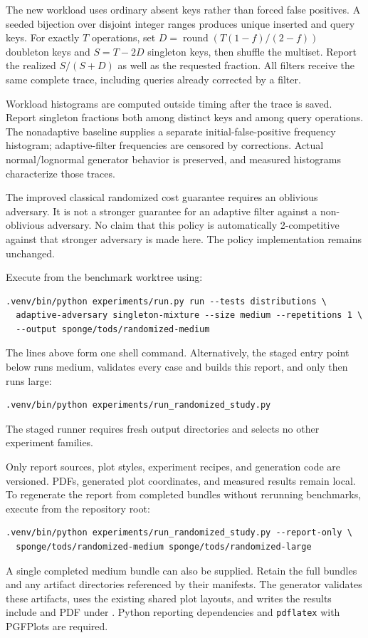 \documentclass[11pt]{article}
\begin{document}
The new workload uses ordinary absent keys rather than forced false positives. A seeded bijection over disjoint integer ranges produces unique inserted and query keys. For exactly $T$ operations, set $D=\operatorname{round}(T(1-f)/(2-f))$ doubleton keys and $S=T-2D$ singleton keys, then shuffle the multiset. Report the realized $S/(S+D)$ as well as the requested fraction. All filters receive the same complete trace, including queries already corrected by a filter.

Workload histograms are computed outside timing after the trace is saved. Report singleton fractions both among distinct keys and among query operations. The nonadaptive baseline supplies a separate initial-false-positive frequency histogram; adaptive-filter frequencies are censored by corrections. Actual normal/lognormal generator behavior is preserved, and measured histograms characterize those traces.

The improved classical randomized cost guarantee requires an oblivious adversary. It is not a stronger guarantee for an adaptive filter against a non-oblivious adversary. No claim that this policy is automatically 2-competitive against that stronger adversary is made here. The policy implementation remains unchanged.

Execute from the benchmark worktree using:
\begin{verbatim}
.venv/bin/python experiments/run.py run --tests distributions \
  adaptive-adversary singleton-mixture --size medium --repetitions 1 \
  --output sponge/tods/randomized-medium
\end{verbatim}
The lines above form one shell command. Alternatively, the staged entry point below runs medium, validates every case and builds this report, and only then runs large:
\begin{verbatim}
.venv/bin/python experiments/run_randomized_study.py
\end{verbatim}
The staged runner requires fresh output directories and selects no other experiment families.

Only report sources, plot styles, experiment recipes, and generation code are versioned. PDFs, generated plot coordinates, and measured results remain local. To regenerate the report from completed bundles without rerunning benchmarks, execute from the repository root:
\begin{verbatim}
.venv/bin/python experiments/run_randomized_study.py --report-only \
  sponge/tods/randomized-medium sponge/tods/randomized-large
\end{verbatim}
A single completed medium bundle can also be supplied. Retain the full bundles and any artifact directories referenced by their manifests. The generator validates these artifacts, uses the existing shared plot layouts, and writes the results include and PDF under . Python reporting dependencies and \texttt{pdflatex} with PGFPlots are required.
\end{document}

